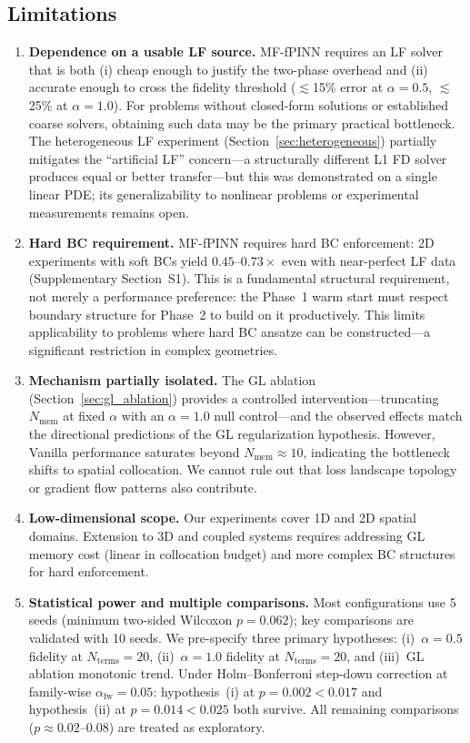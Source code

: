 \documentclass[preprint,12pt]{elsarticle}
\begin{document}
\subsection{Limitations}
\label{sec:limitations}

\begin{enumerate}
    \item \textbf{Dependence on a usable LF source.} MF-fPINN requires an LF solver that is both (i) cheap enough to justify the two-phase overhead and (ii) accurate enough to cross the fidelity threshold ($\lesssim$15\% error at $\alpha = 0.5$, $\lesssim$25\% at $\alpha = 1.0$). For problems without closed-form solutions or established coarse solvers, obtaining such data may be the primary practical bottleneck. The heterogeneous LF experiment (Section~\ref{sec:heterogeneous}) partially mitigates the ``artificial LF'' concern---a structurally different L1 FD solver produces equal or better transfer---but this was demonstrated on a single linear PDE; its generalizability to nonlinear problems or experimental measurements remains open.
    \item \textbf{Hard BC requirement.} MF-fPINN requires hard BC enforcement: 2D experiments with soft BCs yield $0.45$--$0.73\times$ even with near-perfect LF data (Supplementary Section~S1). This is a fundamental structural requirement, not merely a performance preference: the Phase~1 warm start must respect boundary structure for Phase~2 to build on it productively. This limits applicability to problems where hard BC ansatze can be constructed---a significant restriction in complex geometries.
    \item \textbf{Mechanism partially isolated.} The GL ablation (Section~\ref{sec:gl_ablation}) provides a controlled intervention---truncating $N_{\mathrm{mem}}$ at fixed $\alpha$ with an $\alpha = 1.0$ null control---and the observed effects match the directional predictions of the GL regularization hypothesis. However, Vanilla performance saturates beyond $N_{\mathrm{mem}} \approx 10$, indicating the bottleneck shifts to spatial collocation. We cannot rule out that loss landscape topology or gradient flow patterns also contribute.
    \item \textbf{Low-dimensional scope.} Our experiments cover 1D and 2D spatial domains. Extension to 3D and coupled systems requires addressing GL memory cost (linear in collocation budget) and more complex BC structures for hard enforcement.
    \item \textbf{Statistical power and multiple comparisons.} Most configurations use 5 seeds (minimum two-sided Wilcoxon $p = 0.062$); key comparisons are validated with 10 seeds. We pre-specify three primary hypotheses: (i)~$\alpha = 0.5$ fidelity at $N_{\mathrm{terms}} = 20$, (ii)~$\alpha = 1.0$ fidelity at $N_{\mathrm{terms}} = 20$, and (iii)~GL ablation monotonic trend. Under Holm--Bonferroni step-down correction at family-wise $\alpha_{\mathrm{fw}} = 0.05$: hypothesis~(i) at $p = 0.002 < 0.017$ and hypothesis~(ii) at $p = 0.014 < 0.025$ both survive. All remaining comparisons ($p \approx 0.02$--$0.08$) are treated as exploratory.

\end{enumerate}
\end{document}

